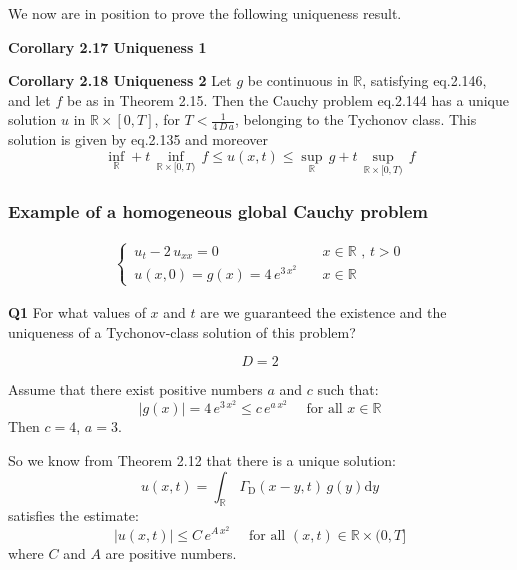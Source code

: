 \documentclass[../main.tex]{subfiles}
\begin{document}
We now are in position to prove the following uniqueness result.

\textbf{Corollary 2.17 Uniqueness 1}  

\textbf{Corollary 2.18 Uniqueness 2}  Let $g$ be continuous in $\mathbb{R}$, satisfying eq.2.146, and let $f$ be as in Theorem 2.15. Then the Cauchy problem eq.2.144 has a unique solution $u$ in $\mathbb{R} \times [0,T]$, for $T < \frac{1}{4 \, D \, a}$, belonging to the Tychonov class. This solution is given by eq.2.135 and moreover
\begin{equation}
    \inf_{\mathbb{R}} + t \, \inf_{\mathbb{R} \times [0,T)} \, f \leqslant u(x,t) \leqslant \sup_{\mathbb{R}} \, g + t \, \sup_{\mathbb{R} \times [0,T)} \, f
\end{equation}

\subsubsection{Example of a homogeneous global Cauchy problem}

\begin{align}
    \begin{cases}
        \, u_t - 2 \, u_{xx} = 0 & \quad x \in \mathbb{R} \text{ ,  } t > 0 \\
        \, u(x,0) = g(x) = 4 \, e^{3 \, x^2} & \quad x \in \mathbb{R}
    \end{cases}
\end{align}

\textbf{Q1}  For what values of $x$ and $t$ are we guaranteed the existence and the uniqueness of a Tychonov-class solution of this problem?

\begin{equation}
    D = 2
\end{equation}

Assume that there exist positive numbers $a$ and $c$ such that:
\begin{equation}
    |g(x)| = 4 \, e^{3 \, x^2} \leqslant c \, e^{a \, x^2} \quad \text{ for all  } x \in \mathbb{R}
\end{equation}
Then $c = 4$, $a = 3$.

So we know from Theorem 2.12 that there is a unique solution:
\begin{equation}
    u(x,t) = \int_{\mathbb{R}} \, \Gamma_\mathrm{D}(x-y,t) \, g(y) \mathrm{d} y
\end{equation}
satisfies the estimate:
\begin{equation}
    |u(x,t)| \leqslant C \, e^{A \, x^2} \quad \text{ for all  } (x,t) \in \mathbb{R} \times (0,T]
\end{equation}
where $C$ and $A$ are positive numbers.
\end{document}

